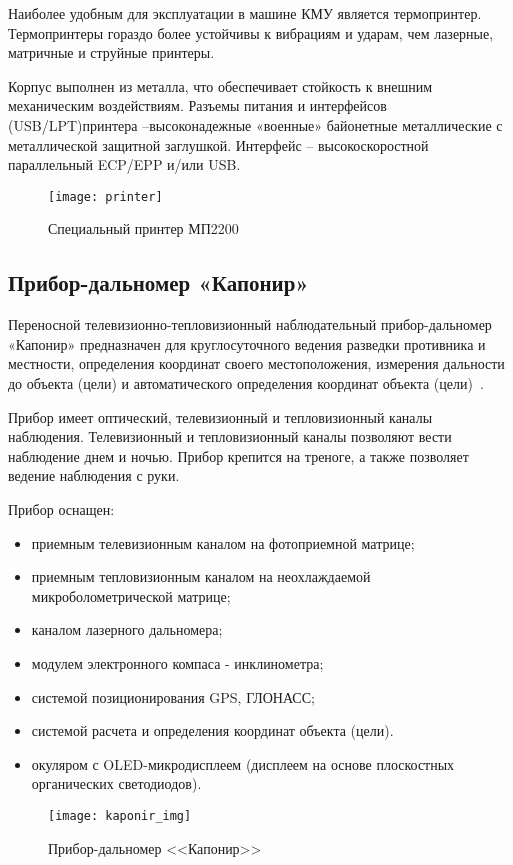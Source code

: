 Наиболее удобным для эксплуатации в машине КМУ является термопринтер. Термопринтеры гораздо более устойчивы к вибрациям и ударам, чем лазерные, матричные и струйные принтеры.

Корпус выполнен из металла, что обеспечивает стойкость к внешним механическим воздействиям.
Разъемы питания и интерфейсов (USB/LPT)\break принтера –высоконадежные «военные» байонетные металлические с металлической защитной заглушкой.
Интерфейс – высокоскоростной параллельный ECP/EPP и/или USB.

\begin{figure}
	\centering
	\texttt{[image: printer]}
	\caption{Специальный принтер МП2200~\cite{mp2200}}
	\label{fig:lit_reiview:spec_printer:printer}
\end{figure}

\subsection{Прибор-дальномер «Капонир»}
\label{sub:lit_review:kaponir}
Переносной телевизионно-тепловизионный наблюдательный прибор-дальномер «Капонир» предназначен для круглосуточного
ведения разведки противника и местности, определения координат своего местоположения, измерения дальности до объекта
(цели) и автоматического определения координат объекта (цели)~\cite{kaponir}.

Прибор имеет оптический, телевизионный и тепловизионный каналы наблюдения. Телевизионный и тепловизионный каналы позволяют
вести наблюдение днем и ночью. Прибор  крепится на треноге, а также  позволяет ведение наблюдения с руки.

Прибор оснащен:
\begin{itemize}
	\item приемным телевизионным каналом на фотоприемной матрице;
	\item приемным тепловизионным каналом на неохлаждаемой микроболометрической матрице;
	\item каналом лазерного дальномера;
	\item модулем электронного компаса - инклинометра;
	\item системой позиционирования GPS, ГЛОНАСС;
	\item системой расчета и определения координат объекта (цели).
	\item окуляром с OLED-микродисплеем (дисплеем на основе плоскостных органических светодиодов).
\end{itemize}

\begin{figure}
	\centering
	\texttt{[image: kaponir\_img]}
	\caption{Прибор-дальномер <<Капонир>>~\cite{kaponir}}
	\label{fig:lit_reiview:kaponir:kaponir_img}
\end{figure}

